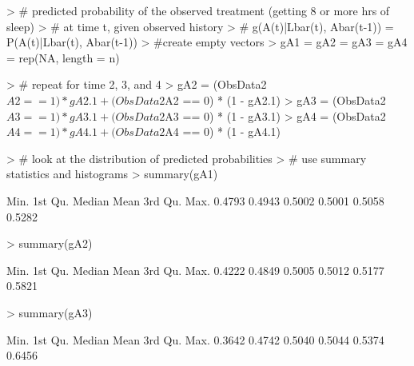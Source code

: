 \documentclass{exam}
\begin{document}
\begin{enumerate}
\begin{solution}
\begin{Schunk}
\begin{Sinput}
> # predicted probability of the observed treatment (getting 8 or more hrs of sleep) 
> # at time t, given observed history
> # g(A(t)|Lbar(t), Abar(t-1)) = P(A(t)|Lbar(t), Abar(t-1))
> #create empty vectors
> gA1 = gA2 = gA3 = gA4 = rep(NA, length = n)
\end{Sinput}
\end{Schunk}
\begin{Schunk}
\end{Schunk}
\begin{Schunk}
\begin{Sinput}
> # repeat for time 2, 3, and 4
> gA2 = (ObsData2$A2 == 1) * gA2.1 + (ObsData2$A2 == 0) * (1 - gA2.1)
> gA3 = (ObsData2$A3 == 1) * gA3.1 + (ObsData2$A3 == 0) * (1 - gA3.1)
> gA4 = (ObsData2$A4 == 1) * gA4.1 + (ObsData2$A4 == 0) * (1 - gA4.1)
\end{Sinput}
\end{Schunk}
\begin{Schunk}
\begin{Sinput}
> # look at the distribution of predicted probabilities 
> # use summary statistics and histograms
> summary(gA1)
\end{Sinput}
\begin{Soutput}
   Min. 1st Qu.  Median    Mean 3rd Qu.    Max. 
 0.4793  0.4943  0.5002  0.5001  0.5058  0.5282 
\end{Soutput}
\begin{Sinput}
> summary(gA2)
\end{Sinput}
\begin{Soutput}
   Min. 1st Qu.  Median    Mean 3rd Qu.    Max. 
 0.4222  0.4849  0.5005  0.5012  0.5177  0.5821 
\end{Soutput}
\begin{Sinput}
> summary(gA3)
\end{Sinput}
\begin{Soutput}
   Min. 1st Qu.  Median    Mean 3rd Qu.    Max. 
 0.3642  0.4742  0.5040  0.5044  0.5374  0.6456 
\end{Soutput}
\begin{Sinput}

\end{Sinput}
\end{Schunk}
\end{solution}
\end{enumerate}
\end{document}
